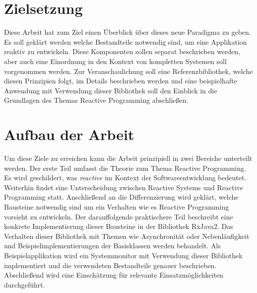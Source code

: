\section{Zielsetzung}
Diese Arbeit hat zum Ziel einen Überblick über dieses neue Paradigma zu geben. Es soll geklärt werden welche Bestandteile notwendig sind, um eine Applikation reaktiv zu entwickeln. Diese Komponenten sollen separat beschrieben werden, aber auch eine Einordnung in den Kontext von kompletten Systemen soll vorgenommen werden. Zur Veranschaulichung soll eine Referenzbibliothek, welche diesen Prinzipien folgt, im Details beschrieben werden und eine beispielhafte Anwendung mit Verwendung dieser Bibliothek soll den Einblick in die Grundlagen des Themas Reactive Programming abschließen.
\section{Aufbau der Arbeit}
Um diese Ziele zu erreichen kann die Arbeit prinzipiell in zwei Bereiche unterteilt werden. Der erste Teil umfasst die Theorie zum Thema Reactive Programming. Es wird geschildert, was \textit{reactive} im Kontext der Softwareentwicklung bedeutet. Weiterhin findet eine Unterscheidung zwischen Reactive Systems und Reactive Programming statt. Anschließend an die Differenzierung wird geklärt, welche Bausteine notwendig sind um ein Verhalten wie es Reactive Programming vorsieht zu entwickeln. Der darauffolgende praktischere Teil beschreibt eine konkrete Implementierung dieser Bausteine in der Bibliothek RxJava2. Das Verhalten dieser Bibliothek mit Themen wie Asynchronität oder Nebenläufigkeit und Beispielimplementierungen der Basisklassen werden behandelt. Als Beispielapplikation wird ein Systemmonitor mit Verwendung dieser Bibliothek implementiert und die verwendeten Bestandteile genauer beschrieben. Abschließend wird eine Einschätzung für relevante Einsatzmöglichkeiten durchgeführt.

